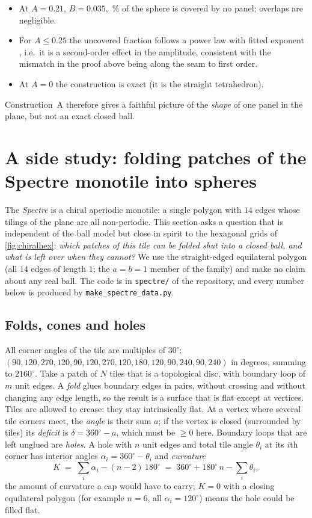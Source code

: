 \documentclass[11pt]{article}
\theoremstyle{definition}
\theoremstyle{remark}
\begin{document}
\begin{itemize}
\item At $A=0.21$, $B=0.035$, \gapUser\,\% of the sphere is covered by no panel; overlaps are negligible.
\item For $A\le0.25$ the uncovered fraction follows a power law with fitted exponent \gapSlope, i.e.\ it is a second-order effect in the
 amplitude, consistent with the mismatch in the proof above being along the seam to first order.
\item At $A=0$ the construction is exact (it is the straight tetrahedron).
\end{itemize}
Construction~A therefore gives a faithful picture of the \emph{shape} of one panel in the plane, but not an exact closed ball.

\section{A side study: folding patches of the Spectre monotile into spheres}\label{sec:spectre}
The \emph{Spectre} \citep{smith_spectre} is a chiral aperiodic monotile: a single polygon with $14$ edges whose tilings of the plane are all
non-periodic. This section asks a question that is independent of the ball model but
close in spirit to the hexagonal grids of \cref{fig:chiralhex}: \emph{which patches of this tile can be folded shut into a closed ball, and what is left
over when they cannot?} We use the straight-edged equilateral polygon (all $14$ edges of length $1$; the $a=b=1$ member of the family) and make no
claim about any real ball. The code is in \texttt{spectre/} of the repository, and every number below is produced by \texttt{make\_spectre\_data.py}.

\subsection{Folds, cones and holes}
All corner angles of the tile are multiples of $30^\circ$: $(90,120,270,120,90,120,270,120,180,120,90,240,90,240)$ in degrees, summing to $2160^\circ$.
Take a patch of $N$ tiles that is a topological disc, with boundary loop of $m$ unit edges. A \emph{fold} glues boundary edges in pairs, without crossing and
without changing any edge length, so the result is a surface that is flat except at vertices. Tiles are allowed to crease: they stay intrinsically flat.
At a vertex where several tile corners meet, the \emph{angle} is their sum $a$; if the vertex is closed (surrounded by tiles) its \emph{deficit} is $\delta=360^\circ-a$, which must be $\ge 0$ here.
Boundary loops that are left unglued are \emph{holes}. A hole with $n$ unit edges and total tile angle $\theta_i$ at its $i$th corner has interior angles $\alpha_i=360^\circ-\theta_i$ and
\emph{curvature}
\begin{equation}K\;=\;\sum_i\alpha_i-(n-2)\,180^\circ\;=\;360^\circ+180^\circ\,n-\sum_i\theta_i,\label{eq:holeK}\end{equation}
the amount of curvature a cap would have to carry; $K=0$ with a closing equilateral polygon (for example $n=6$, all $\alpha_i=120^\circ$) means the hole could be filled flat.
\end{document}
